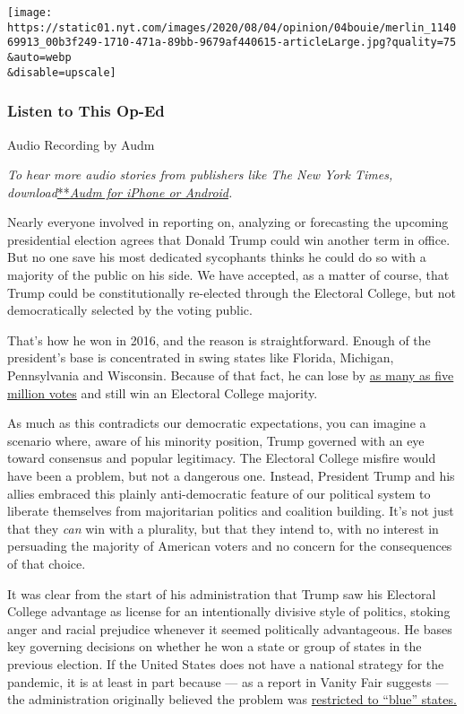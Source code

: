 \texttt{[image: https://static01.nyt.com/images/2020/08/04/opinion/04bouie/merlin\_114069913\_00b3f249-1710-471a-89bb-9679af440615-articleLarge.jpg?quality=75\\\&auto=webp\\\&disable=upscale]}

\hypertarget{listen-to-this-op-ed}{%
\subsubsection{Listen to This Op-Ed}\label{listen-to-this-op-ed}}

Audio Recording by Audm

\emph{To hear more audio stories from publishers like The New York
Times,
download}\href{https://www.audm.com/?utm_source=nytmag\&utm_medium=embed\&utm_campaign=left_behind_draper}{**}\href{https://www.audm.com/?utm_source=nytopinion\&utm_medium=embed\&utm_campaign=trump_votes_want}{\emph{Audm
for iPhone or Android}}\emph{.}

Nearly everyone involved in reporting on, analyzing or forecasting the
upcoming presidential election agrees that Donald Trump could win
another term in office. But no one save his most dedicated sycophants
thinks he could do so with a majority of the public on his side. We have
accepted, as a matter of course, that Trump could be constitutionally
re-elected through the Electoral College, but not democratically
selected by the voting public.

That's how he won in 2016, and the reason is straightforward. Enough of
the president's base is concentrated in swing states like Florida,
Michigan, Pennsylvania and Wisconsin. Because of that fact, he can lose
by
\href{https://www.nbcnews.com/politics/2020-election/how-trump-could-lose-5-million-votes-still-win-2020-n1031601}{as
many as five million votes} and still win an Electoral College majority.

As much as this contradicts our democratic expectations, you can imagine
a scenario where, aware of his minority position, Trump governed with an
eye toward consensus and popular legitimacy. The Electoral College
misfire would have been a problem, but not a dangerous one. Instead,
President Trump and his allies embraced this plainly anti-democratic
feature of our political system to liberate themselves from majoritarian
politics and coalition building. It's not just that they \emph{can} win
with a plurality, but that they intend to, with no interest in
persuading the majority of American voters and no concern for the
consequences of that choice.

It was clear from the start of his administration that Trump saw his
Electoral College advantage as license for an intentionally divisive
style of politics, stoking anger and racial prejudice whenever it seemed
politically advantageous. He bases key governing decisions on whether he
won a state or group of states in the previous election. If the United
States does not have a national strategy for the pandemic, it is at
least in part because --- as a report in Vanity Fair suggests --- the
administration originally believed the problem was
\href{https://www.vanityfair.com/news/2020/07/how-jared-kushners-secret-testing-plan-went-poof-into-thin-air}{restricted
to ``blue'' states.}

